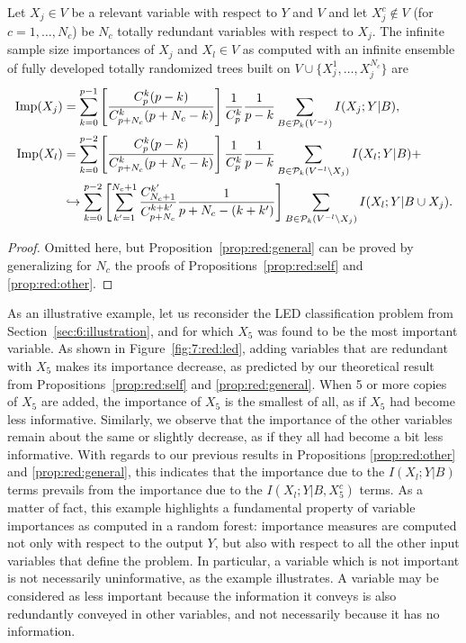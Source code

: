 \begin{proposition}\label{prop:red:general}
Let $X_j\in V$ be a relevant variable with respect to $Y$ and $V$ and let
$X_j^c \notin V$ (for $c=1,\dots,N_c$) be $N_c$ totally redundant variables with respect to $X_j$.
The infinite sample size importances of $X_j$ and $X_l \in V$ as computed with an infinite
ensemble of fully developed totally randomized trees built on $V\cup
\{X_j^1,\dots,X_j^{N_c}\}$ are
\begin{align*}
\text{Imp}(X_j)  &= \sum_{k=0}^{p-1} \left[ \frac{C^k_p (p-k)}{C^k_{p+N_c}(p+N_c-k)}  \right] \frac{1}{C_p^k} \frac{1}{p-k} \sum_{B \in {\cal P}_k(V^{-j})} I(X_j;Y|B), \\
\text{Imp}(X_l) &= \sum_{k=0}^{p-2} \left[ \frac{C^k_p (p-k)}{C^k_{p+N_c}(p+N_c-k)}  \right] \frac{1}{C_p^k} \frac{1}{p-k} \sum_{B \in {\cal P}_k(V^{-l} \setminus X_j)} I(X_l;Y|B) + \\
                & \hookrightarrow \sum_{k=0}^{p-2}  \left[ \sum_{k'=1}^{N_c+1} \frac{C^{k'}_{N_c+1}}{C_{p+N_c}^{k+k'}} \frac{1}{p+N_c-(k+k')} \right]  \sum_{B \in {\cal P}_k(V^{-l}\setminus X_j)} I(X_l;Y|B\cup X_j).
\end{align*}
\end{proposition}

\begin{proof}
Omitted here, but Proposition~\ref{prop:red:general} can be proved
by generalizing for $N_c$ the proofs of Propositions~\ref{prop:red:self}
and \ref{prop:red:other}.
\end{proof}

As an illustrative example, let us reconsider the LED classification problem
from Section~\ref{sec:6:illustration}, and for which $X_5$ was found to be the
most important variable. As shown in Figure~\ref{fig:7:red:led}, adding
variables that are redundant with $X_5$ makes its importance decrease, as
predicted by our theoretical result from Propositions~\ref{prop:red:self} and
\ref{prop:red:general}. When 5 or more copies of $X_5$ are added, the
importance of $X_5$ is the smallest of all, as if $X_5$ had become less
informative. Similarly, we observe that the importance of the other variables
remain about the same or slightly decrease, as if they all had become a bit
less informative. With regards to our previous results in Propositions
\ref{prop:red:other} and \ref{prop:red:general}, this indicates that the
importance due to the $I(X_l;Y|B)$ terms prevails from  the importance due to
the $I(X_l;Y|B,X_5^c)$ terms. As a matter of fact, this example highlights a
fundamental property of variable importances as computed in a random forest:
importance measures are computed not only with respect to the output $Y$, but
also with respect to all the other input variables that define the problem. In
particular, a variable which is not important is not necessarily uninformative,
as the example illustrates. A variable may be considered as less important
because the  information it conveys is also redundantly conveyed in other
variables, and not necessarily because it has no information.


